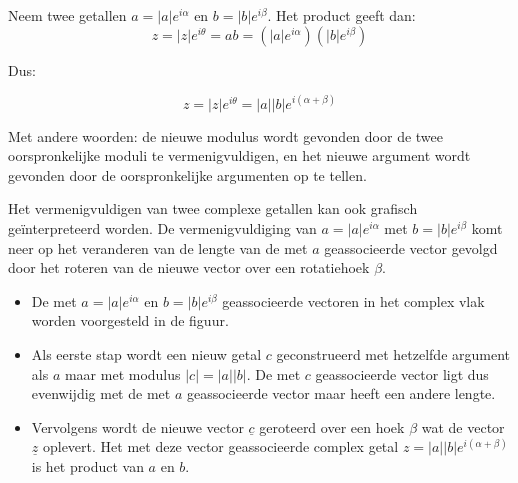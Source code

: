 \vspace{0.2cm}

\begin{eigenschap}
	Neem twee getallen $a=|a|e^{i\alpha}$ en $b=|b|e^{i \beta}$. Het product geeft dan:\\

\[  z=|z|e^{i \theta}=ab=(|a|e^{i\alpha})(|b|e^{i \beta})  \]

Dus:\\

\begin{framed}
	\[ z=|z|e^{i \theta}=|a||b|e^{i (\alpha + \beta)}       \]
\end{framed}
\end{eigenschap}

Met andere woorden: de nieuwe modulus wordt gevonden door de twee oorspronkelijke moduli te vermenigvuldigen, en het nieuwe argument wordt gevonden door de oorspronkelijke argumenten op te tellen.\\

\vspace{0.2cm}

Het vermenigvuldigen van twee complexe getallen kan ook grafisch ge\"{i}nterpreteerd worden. De vermenigvuldiging van $a=|a|e^{i\alpha}$ met $b=|b|e^{i\beta}$ komt neer op het veranderen van de lengte van de met $a$ geassocieerde vector gevolgd door het roteren van de nieuwe vector over een rotatiehoek $\beta$.\\



\begin{itemize}
	\item De met $a=|a|e^{i\alpha}$ en $b=|b|e^{i\beta}$ geassocieerde vectoren in het complex vlak worden voorgesteld in de figuur.
	\item Als eerste stap wordt een nieuw getal $c$ geconstrueerd met hetzelfde argument als $a$ maar met modulus $|c|=|a||b|$. De met $c$ geassocieerde vector ligt dus evenwijdig met de met $a$ geassocieerde vector maar heeft een andere lengte.
	\item Vervolgens wordt de nieuwe vector $\underline{c}$ geroteerd over een hoek $\beta$ wat de vector $\underline{z}$ oplevert. Het met deze vector geassocieerde complex getal $z=|a||b|e^{i(\alpha + \beta)}$ is het product van $a$ en $b$.
\end{itemize}


